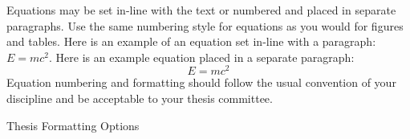 Equations may be set in-line with the text or numbered and placed in separate
paragraphs.  Use the same numbering style for equations as you would for
figures and tables.  Here is an example of an equation set in-line with a
paragraph: $E = mc^2$.  Here is an example equation placed in a separate
paragraph:
\begin{equation}
E = mc^2
\end{equation}
Equation numbering and formatting should follow the usual convention of your
discipline and be acceptable to your thesis committee.

\newpage
\begin{table}[h]
	\caption{Thesis Formatting Options\label{tab:options}}
	\vspace{0.125in}
	\centering
	

\end{table}
